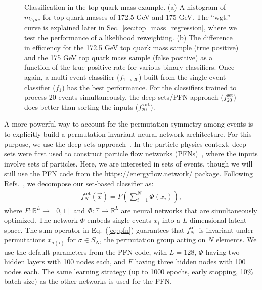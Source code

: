 \documentclass[aps,prx,reprint,preprintnumbers,superscriptaddress,nofootinbib,longbibliography,floatfix]{revtex4-2}
\DeclareRobustCommand{\Sec}[1]{Sec.~\ref{sec:#1}}
\DeclareRobustCommand{\Eq}[1]{Eq.~(\ref{eq:#1})}
\DeclareRobustCommand{\Refs}[1]{Refs.~\cite{#1}}
\begin{document}
 \begin{figure*}[t]
 \centering
 $\qquad$
 \caption{Classification in the top quark mass example.
 (a)  A histogram of $m_{b_1\mu\nu}$ for top quark masses of 172.5 GeV and 175 GeV.  The ``wgt.'' curve is explained later in \Sec{top_mass_regression}, where we test the performance of a likelihood reweighting.
%
(b) The difference in efficiency for the 172.5 GeV top quark mass sample (true positive) and the 175 GeV top quark mass sample (false positive) as a function of the true positive rate for various binary classifiers.  Once again, a multi-event classifier ($f_{1 \to 20}$) built from the single-event classifier ($f_{1}$) has the best performance.  For the classifiers trained to process 20 events simultaneously, the deep sets/PFN approach ($f_{20}^\text{set}$) does better than sorting the inputs ($f_{20}^\text{sort}$).}
 \label{fig:top}
 \end{figure*}


A more powerful way to account for the permutation symmetry among events is to explicitly build a permutation-invariant neural network architecture.
%
For this purpose, we use the deep sets approach~\cite{10.5555/3294996.3295098}.
%
In the particle physics context, deep sets were first used to construct particle flow networks (PFNs)~\cite{Komiske:2018cqr}, where the inputs involve sets of particles.
%
Here, we are interested in sets of events, though we will still use the PFN code from the \url{https://energyflow.network/} package.
%
Following \Refs{10.5555/3294996.3295098,Komiske:2018cqr}, we decompose our set-based classifier as:
%
\begin{align}
\label{eq:pfn}
    f^\text{set}_N(\vec{x}) = F\left(\sum_{i=1}^N\Phi(x_i)\right),
\end{align}
%
where $F:\mathbb{R}^L\rightarrow [0,1]$ and $\Phi:\mathbb{E}\rightarrow\mathbb{R}^L$ are neural networks that are simultaneously optimized.
%
The network $\Phi$ embeds single events $x_i$ into a $L$-dimensional latent space.
%
The sum operator in \Eq{pfn} guarantees that $f^\text{set}_N$ is invariant under permutations $x_{\sigma(i)}$ for $\sigma\in S_N$, the permutation group acting on $N$ elements.
%
We use the default parameters from the PFN code, with $L=128$, $\Phi$ having two hidden layers with 100 nodes each, and $F$ having three hidden nodes with 100 nodes each.
%
The same learning strategy (up to 1000 epochs, early stopping, 10\% batch size) as the other networks is used for the PFN.
\end{document}
